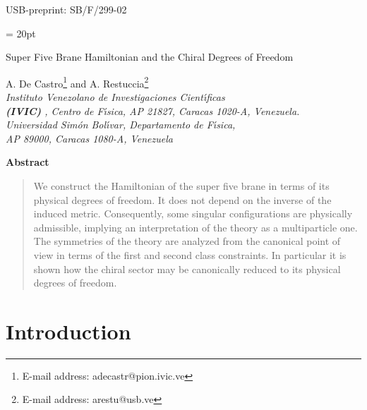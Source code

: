 \documentclass[a4paper,12pt]{article}
\begin{document}
\vspace*{-.6in}
\thispagestyle{empty}
\begin{flushright}
USB-preprint: SB/F/299-02
\end{flushright}
\baselineskip = 20pt


\vspace{.5in}
{\Large
\begin{center}
{Super Five Brane Hamiltonian and the Chiral Degrees of Freedom}
\end{center}}

\begin{center}
A. De Castro{\footnote{E-mail address:
adecastr@pion.ivic.ve}\myHighlight{$^{\dagger}$}\coordHE{}} and A.
Restuccia{\footnote{E-mail address: arestu@usb.ve}\myHighlight{$^{\ddag}$}\coordHE{}}\\
\emph{\myHighlight{$^{\dagger}$}\coordHE{}Instituto Venezolano de Investigaciones
Cient\'{\i}ficas
\\ {\bf(IVIC)} , Centro de F\'{\i}sica, AP 21827, Caracas 1020-A, Venezuela.\\
{\myHighlight{$^{\ddag}$}\coordHE{} Universidad Sim\'on Bol\'{\i}var, Departamento de F\'{\i}sica,
\\ AP 89000, Caracas 1080-A, Venezuela}}
\end{center}
\vspace{.5in}



\begin{center}
\textbf{Abstract}
\end{center}


\begin{quotation}
\noindent We construct the Hamiltonian of the super five brane in
terms of its physical degrees of freedom. It does not depend on
the inverse of the induced metric. Consequently, some singular
configurations are physically admissible, implying an
interpretation of the theory as a multiparticle one.  The
symmetries of the theory are analyzed from the canonical point of
view in terms of the first and second class constraints. In
particular it is shown how the chiral sector may be canonically
reduced to its physical degrees of freedom.
\end{quotation}
\vfil

\newpage


\section{\label{intro}Introduction}
\end{document}
